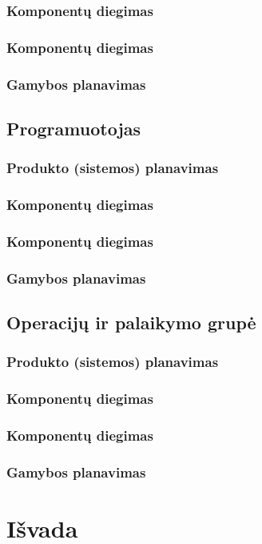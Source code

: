 \documentclass{VUMIFPSkursinis}
\begin{document}
\subsubsection{Komponentų diegimas}
\subsubsection{Komponentų diegimas}
\subsubsection{Gamybos planavimas}
\subsection{Programuotojas}
\subsubsection{Produkto (sistemos) planavimas}
\subsubsection{Komponentų diegimas}
\subsubsection{Komponentų diegimas}
\subsubsection{Gamybos planavimas}
\subsection{Operacijų ir palaikymo grupė}
\subsubsection{Produkto (sistemos) planavimas}
\subsubsection{Komponentų diegimas}
\subsubsection{Komponentų diegimas}
\subsubsection{Gamybos planavimas}

\section{Išvada}
\end{document}
